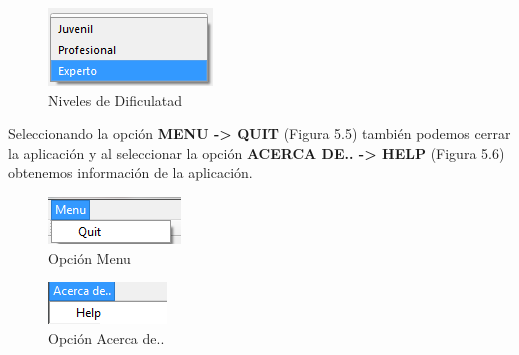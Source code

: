 \begin{figure}[htbp]
\begin{center}
\includegraphics[width=.20\textwidth]{./imagenes/Nivel.png}
\caption{Niveles de Dificulatad}
\label{Niveles de Dificulatad}
\end{center}
\end{figure}

\begin{center}
Seleccionando la opción \textbf{MENU -> QUIT} (Figura 5.5) también podemos cerrar la aplicación y al seleccionar la opción \textbf{ACERCA DE.. -> HELP} (Figura 5.6) obtenemos información de la aplicación.
\end{center}

\begin{figure}[htbp]
\begin{center}
\includegraphics[width=.15\textwidth]{./imagenes/SeleccionMenu.png}
\caption{Opción Menu}
\label{Opcion Menu}
\end{center}
\end{figure}

\begin{figure}[htbp]
\begin{center}
\includegraphics[width=.15\textwidth]{./imagenes/SeleccionAcerca.png}
\caption{Opción Acerca de..}
\label{Opcion Acerca de..}
\end{center}
\end{figure}




